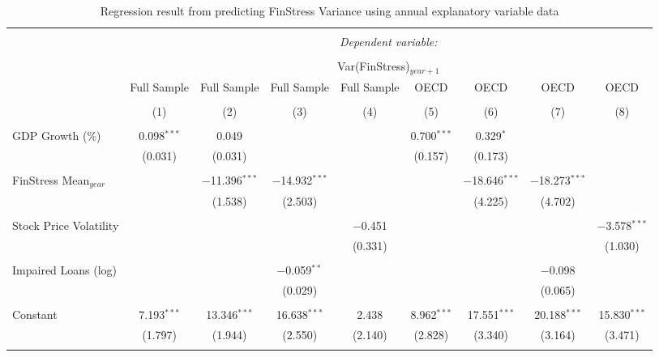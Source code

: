 
\begin{table}[!htbp] \centering 
  \caption{Regression result from predicting FinStress Variance using annual explanatory variable data} 
  \label{annual_reg} 
\tiny 
\begin{tabular}{@{\extracolsep{5pt}}lcccccccc} 
\\[-1.8ex]\hline 
\hline \\[-1.8ex] 
 & \multicolumn{8}{c}{\textit{Dependent variable:}} \\ 
\cline{2-9} 
\\[-1.8ex] & \multicolumn{8}{c}{Var(FinStress)$_{year+1}$} \\ 
 & Full Sample & Full Sample & Full Sample & Full Sample & OECD & OECD & OECD & OECD \\ 
\\[-1.8ex] & (1) & (2) & (3) & (4) & (5) & (6) & (7) & (8)\\ 
\hline \\[-1.8ex] 
 GDP Growth (\%) & 0.098$^{***}$ & 0.049 &  &  & 0.700$^{***}$ & 0.329$^{*}$ &  &  \\ 
  & (0.031) & (0.031) &  &  & (0.157) & (0.173) &  &  \\ 
  & & & & & & & & \\ 
 FinStress Mean$_{year}$ &  & $-$11.396$^{***}$ & $-$14.932$^{***}$ &  &  & $-$18.646$^{***}$ & $-$18.273$^{***}$ &  \\ 
  &  & (1.538) & (2.503) &  &  & (4.225) & (4.702) &  \\ 
  & & & & & & & & \\ 
 Stock Price Volatility &  &  &  & $-$0.451 &  &  &  & $-$3.578$^{***}$ \\ 
  &  &  &  & (0.331) &  &  &  & (1.030) \\ 
  & & & & & & & & \\ 
 Impaired Loans (log) &  &  & $-$0.059$^{**}$ &  &  &  & $-$0.098 &  \\ 
  &  &  & (0.029) &  &  &  & (0.065) &  \\ 
  & & & & & & & & \\ 
 Constant & 7.193$^{***}$ & 13.346$^{***}$ & 16.638$^{***}$ & 2.438 & 8.962$^{***}$ & 17.551$^{***}$ & 20.188$^{***}$ & 15.830$^{***}$ \\ 
  & (1.797) & (1.944) & (2.550) & (2.140) & (2.828) & (3.340) & (3.164) & (3.471) \\ 
  & & & & & & & & \\ 

\end{tabular}
\end{table}
